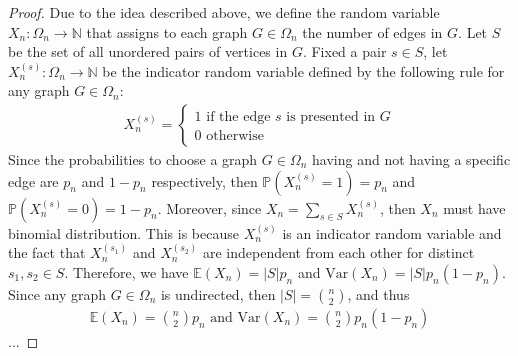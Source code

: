 \begin{proof}
  Due to the idea described above, we define the random variable $X_{n} : \Omega_{n} \to \mathbb{N}$ that assigns to each graph $G \in \Omega_{n}$ the number of edges in $G$. Let $S$ be the set of all unordered pairs of vertices in $G$. Fixed a pair $s \in S$, let $X_{n}^{(s)} : \Omega_{n} \to \mathbb{N}$ be the indicator random variable defined by the following rule for any graph $G \in \Omega_{n}$:
  \begin{align*}
    X_{n}^{(s)} = 
    \begin{cases}
      1 \text{ if the edge $s$ is presented in $G$} \\
      0 \text{ otherwise}
    \end{cases}
  \end{align*}
  Since the probabilities to choose a graph $G \in \Omega_{n}$ having and not having a specific edge are $p_{n}$ and $1-p_{n}$ respectively, then $\mathbb{P}(X_{n}^{(s)}=1)=p_{n}$ and $\mathbb{P}(X_{n}^{(s)}=0)=1-p_{n}$. Moreover, since $X_{n} = \sum\limits_{s \in S} X_{n}^{(s)}$, then $X_{n}$ must have binomial distribution. This is because $X_{n}^{(s)}$ is an indicator random variable and the fact that $X_{n}^{(s_{1})}$ and $X_{n}^{(s_{2})}$ are independent from each other for distinct $s_{1},s_{2} \in S$. Therefore, we have $\mathbb{E}(X_{n}) = |S| p_{n}$ and $\text{Var}(X_{n}) = |S| p_{n} (1-p_{n})$. Since any graph $G \in \Omega_{n}$ is undirected, then $|S| = \binom{n}{2}$, and thus 
  \begin{align*}
    \mathbb{E}(X_{n}) = \binom{n}{2}p_{n} \text{ and } \text{Var}(X_{n}) = \binom{n}{2} p_{n} (1-p_{n})
  \end{align*}
  ...
\end{proof}

